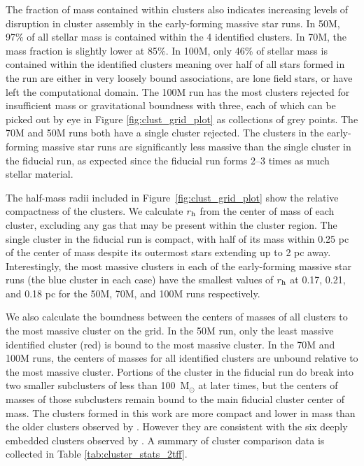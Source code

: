 \documentclass[twoside]{drexel-thesis}
\begin{document}
\begin{thesis}
The fraction of mass contained within clusters also indicates increasing levels of disruption in cluster assembly in the early-forming massive star runs. In 50M, 97\% of all stellar mass is contained within the 4 identified clusters. In 70M, the mass fraction is slightly lower at 85\%. In 100M, only 46\% of stellar mass is contained within the identified clusters meaning over half of all stars formed in the run are either in very loosely bound associations, are lone field stars, or have left the computational domain. The 100M run has the most clusters rejected for insufficient mass or gravitational boundness with three, each of which can be picked out by eye in Figure \ref{fig:clust_grid_plot} as collections of grey points. The 70M and 50M runs both have a single cluster rejected. 
The clusters in the early-forming massive star runs are significantly less massive than the single cluster in the fiducial run, as expected since the fiducial run forms 2--3 times as much stellar material.

The half-mass radii included in Figure~\ref{fig:clust_grid_plot} show the relative compactness of the clusters. We calculate $r_{\rm h}$ from the center of mass of each cluster, excluding any gas that may be present within the cluster region. The single cluster in the fiducial run is compact, with half of its mass within 0.25 pc of the center of mass despite its outermost stars extending up to 2 pc away. Interestingly, the most massive clusters in each of the early-forming massive star runs (the blue cluster in each case) have the smallest values of $r_{\rm h}$ at 0.17, 0.21, and 0.18 pc for the 50M, 70M, and 100M runs respectively. 

We also calculate the boundness between the centers of masses of all clusters to the most massive cluster on the grid. In the 50M run, only the least massive identified cluster (red) is bound to the most massive cluster. In the 70M and 100M runs, the centers of masses for all identified clusters are unbound relative to the most massive cluster. Portions of the cluster in the fiducial run do break into two smaller subclusters of less than 100~M$_\odot$ at later times, but the centers of masses of those subclusters remain bound to the main fiducial cluster center of mass. The clusters formed in this work are more compact and lower in mass than the older clusters observed by \citet{kharchenko_global_2013}. However they are consistent with the six deeply embedded clusters observed by \citet{kuhn_spatial_2014}.
A summary of cluster comparison data is collected in Table \ref{tab:cluster_stats_2tff}.


\end{thesis}
\end{document}
